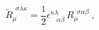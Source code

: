 \begin{equation}
\tilde{R}_{\mu \ \ }^{\ \ \sigma \lambda \kappa }=\frac{1}{2}\epsilon _{\ \
\ \ \alpha \beta }^{\kappa \lambda }\,R_{\mu }^{\ \ \sigma \alpha \beta }\ ,
\label{RIEMANN}
\end{equation}%
